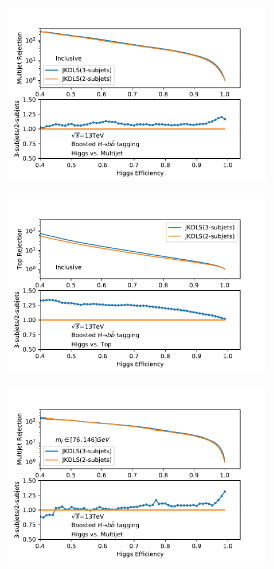 \begin{figure}[htbp]
  \begin{subfigure}{.5\textwidth}
  \centering
   \includegraphics[width=0.75\textwidth]{figuresXbb/Subjet/SUBQCD.pdf}
   \caption{}
  \end{subfigure}
  \begin{subfigure}{.5\textwidth}
  \centering
   \includegraphics[width=0.75\textwidth]{figuresXbb/Subjet/SUBTop.pdf}
     \caption{}
  \end{subfigure}
\newline 
   \begin{subfigure}{.5\textwidth}
  \centering
   \includegraphics[width=0.75\textwidth]{figuresXbb/Subjet/SUBQCDMASS.pdf}

\end{subfigure}
\end{figure}
